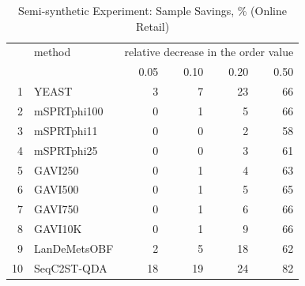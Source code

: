 \begin{table}[ht]
    \caption{Semi-synthetic Experiment: Sample Savings, \% (Online Retail)}\label{tbl:retail-savings}
    \centering
    \begin{small}
    \setlength{\tabcolsep}{4pt}
\begin{tabular}{rlrrrr}
  \hline
 & method & \multicolumn{4}{c}{relative decrease in the order value}\\
 &  & 0.05 & 0.10 & 0.20 & 0.50\\
  \hline
  1 & YEAST & 3 & 7 & 23 & 66 \\
  2 & mSPRTphi100 & 0 & 1 & 5 & 66 \\
  3 & mSPRTphi11 & 0 & 0 & 2 & 58 \\
  4 & mSPRTphi25 & 0 & 0 & 3 & 61 \\
  5 & GAVI250 & 0 & 1 & 4 & 63 \\
  6 & GAVI500 & 0 & 1 & 5 & 65 \\
  7 & GAVI750 & 0 & 1 & 6 & 66 \\
  8 & GAVI10K & 0 & 1 & 9 & 66 \\
  9 & LanDeMetsOBF & 2 & 5 & 18 & 62 \\
  10 & SeqC2ST-QDA & 18 & 19 & 24 & 82 \\
   \hline
\end{tabular}
\end{small}
\end{table}
